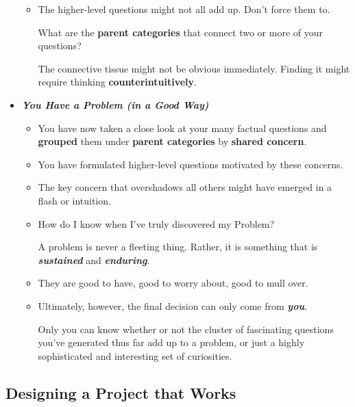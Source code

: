 \documentclass[11pt]{article}
\begin{document}
\begin{itemize}
\begin{exercise}
\begin{itemize}
\item The higher-level questions might not all add up. Don’t force them to. 

What are the \textbf{parent categories} that connect two or more of your questions? 

The connective tissue might not be obvious immediately. Finding it might require thinking \textbf{counterintuitively}.
\end{itemize}
\end{exercise}

\item \emph{\textbf{You Have a Problem (in a Good Way)}}
\begin{itemize}
\item You have now taken a close look at your many factual questions and \textbf{grouped} them under \textbf{parent categories} by \textbf{shared concern}. 

\item You have formulated higher-level questions motivated by these concerns.

\item The key concern that overshadows all others might have emerged in a flash or intuition. 

\item How do I know when I’ve truly discovered my Problem?

A problem is never a fleeting thing. Rather, it is something that is \textbf{\emph{sustained}} and \textbf{\emph{enduring}}.

\item They are good to have, good to worry about, good to mull over.

\item Ultimately, however, the final decision can only come from \textbf{\emph{you}}. 

Only you can know whether or not the cluster of fascinating questions you’ve generated thus far add up to a problem, or just a highly sophisticated and interesting set of curiosities.
\end{itemize}
\end{itemize}


\subsection{Designing a Project that Works}
\end{document}
